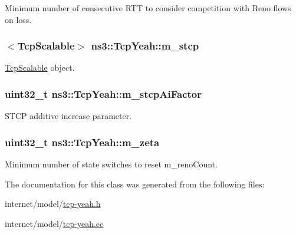 Minimum number of consecutive R\+TT to consider competition with Reno flows on loss. 

\subsubsection[{\texorpdfstring{m\+\_\+stcp}{m_stcp}}]{$<${\bf Tcp\+Scalable}$>$ ns3\+::\+Tcp\+Yeah\+::m\+\_\+stcp\hspace{0.3cm}{\ttfamily [private]}}\hypertarget{classns3_1_1TcpYeah_aa02909129f868dc1b58ade0efa826ff3}{}\label{classns3_1_1TcpYeah_aa02909129f868dc1b58ade0efa826ff3}


\hyperlink{classns3_1_1TcpScalable}{Tcp\+Scalable} object. 

\subsubsection[{\texorpdfstring{m\+\_\+stcp\+Ai\+Factor}{m_stcpAiFactor}}]{\setlength{\rightskip}{0pt plus 5cm}uint32\+\_\+t ns3\+::\+Tcp\+Yeah\+::m\+\_\+stcp\+Ai\+Factor\hspace{0.3cm}{\ttfamily [private]}}\hypertarget{classns3_1_1TcpYeah_a9eab73e1bb55aa7664fb054973e75d49}{}\label{classns3_1_1TcpYeah_a9eab73e1bb55aa7664fb054973e75d49}


S\+T\+CP additive increase parameter. 

\subsubsection[{\texorpdfstring{m\+\_\+zeta}{m_zeta}}]{\setlength{\rightskip}{0pt plus 5cm}uint32\+\_\+t ns3\+::\+Tcp\+Yeah\+::m\+\_\+zeta\hspace{0.3cm}{\ttfamily [private]}}\hypertarget{classns3_1_1TcpYeah_a03fb40380c411b1f33f4669907e1712b}{}\label{classns3_1_1TcpYeah_a03fb40380c411b1f33f4669907e1712b}


Minimum number of state switches to reset m\+\_\+reno\+Count. 



The documentation for this class was generated from the following files\+:\begin{DoxyCompactItemize}
\item 
internet/model/\hyperlink{tcp-yeah_8h}{tcp-\/yeah.\+h}\item 
internet/model/\hyperlink{tcp-yeah_8cc}{tcp-\/yeah.\+cc}\end{DoxyCompactItemize}

